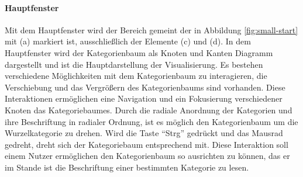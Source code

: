 \paragraph{Hauptfenster}
Mit dem Hauptfenster wird der Bereich gemeint der in Abbildung \ref{fig:small-start} mit (a) markiert ist, ausschließlich der Elemente (c) und (d).
In dem Hauptfenster wird der Kategorienbaum als Knoten und Kanten Diagramm dargestellt und ist die Hauptdarstellung der Visualisierung.
Es bestehen verschiedene Möglichkeiten mit dem Kategorienbaum zu interagieren, die Verschiebung und das Vergrößern des Kategorienbaums sind vorhanden.
Diese Interaktionen ermöglichen eine Navigation und ein Fokusierung verschiedener Knoten das Kategoriebaumes.
Durch die radiale Anordnung der Kategorien und ihre Beschriftung in radialer Ordnung, ist es möglich den Kategorienbaum um die Wurzelkategorie zu drehen.
Wird die Taste "`Strg"' gedrückt und das Mausrad gedreht, dreht sich der Kategoriebaum entsprechend mit.
Diese Interaktion soll einem Nutzer ermöglichen den Kategorienbaum so ausrichten zu können, das er im Stande ist die Beschriftung einer bestimmten Kategorie zu lesen.

